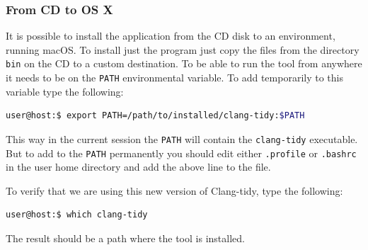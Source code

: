 \subsubsection{From CD to OS X}
\par It is possible to install the application from the CD disk to an environment, running macOS. To install just the program just copy the files from the directory \verb|bin| on the CD to a custom destination. To be able to run the tool from anywhere it needs to be on the \verb|PATH| environmental variable. To add temporarily to this variable type the following:
\begin{lstlisting}[language=bash, frame=single]
user@host:$ export PATH=/path/to/installed/clang-tidy:$PATH
\end{lstlisting}
\par This way in the current session the \verb|PATH| will contain the \verb|clang-tidy| executable. But to add to the \verb|PATH| permanently you should edit either \verb|.profile| or \verb|.bashrc| in the user home directory and add the above line to the file. \medskip
\par To verify that we are using this new version of Clang-tidy, type the following:
\begin{lstlisting}[language=bash, frame=single]
user@host:$ which clang-tidy
\end{lstlisting}
The result should be a path where the tool is installed.
